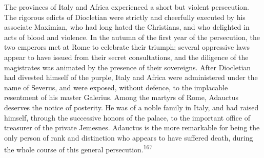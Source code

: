 
The provinces of Italy and Africa experienced a short but violent
persecution. The rigorous edicts of Diocletian were strictly and
cheerfully executed by his associate Maximian, who had long hated
the Christians, and who delighted in acts of blood and violence.
In the autumn of the first year of the persecution, the two
emperors met at Rome to celebrate their triumph; several
oppressive laws appear to have issued from their secret
consultations, and the diligence of the magistrates was animated
by the presence of their sovereigns. After Diocletian had
divested himself of the purple, Italy and Africa were
administered under the name of Severus, and were exposed, without
defence, to the implacable resentment of his master Galerius.
Among the martyrs of Rome, Adauctus deserves the notice of
posterity. He was of a noble family in Italy, and had raised
himself, through the successive honors of the palace, to the
important office of treasurer of the private Jemesnes. Adauctus
is the more remarkable for being the only person of rank and
distinction who appears to have suffered death, during the whole
course of this general persecution.\textsuperscript{167}


